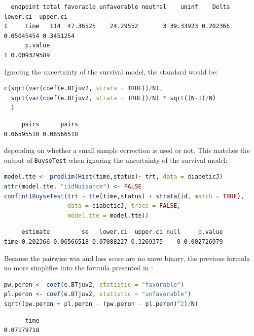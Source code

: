 \documentclass[12pt]{article}
\newcommand\Warning[1][3ex]{%
\renewcommand\stacktype{L}%
\scaleto{\stackon[1.3pt]{\color{red}$\triangle$}{\tiny\bfseries !}}{#1}%
\xspace
}
\begin{document}
\label{}
\begin{verbatim}
  endpoint total favorable unfavorable neutral    uninf    Delta   lower.ci  upper.ci
1     time   114  47.36525    24.29552       3 39.33923 0.202366 0.05045454 0.3451254
      p.value
1 0.009329589
\end{verbatim}


Ignoring the uncertainty of the survival model, the standard would be:
\begin{lstlisting}[language=r,numbers=none]
c(sqrt(var(coef(e.BTjuv2, strata = TRUE))/N),
  sqrt(var(coef(e.BTjuv2, strata = TRUE))/N) * sqrt((N-1)/N)
  )
\end{lstlisting}

\label{}
\begin{verbatim}
     pairs      pairs 
0.06595510 0.06566518
\end{verbatim}


depending on whether a small sample correction is used or not. This
matches the output of \texttt{BuyseTest} when ignoring the uncertainty of the
survival model:
\begin{lstlisting}[language=r,numbers=none]
model.tte <- prodlim(Hist(time,status)~ trt, data = diabeticJ)
attr(model.tte, "iidNuisance") <- FALSE
confint(BuyseTest(trt ~ tte(time,status) + strata(id, match = TRUE), 
                  data = diabeticJ, trace = FALSE,
                  model.tte = model.tte))
\end{lstlisting}

\label{}
\begin{verbatim}
     estimate         se   lower.ci  upper.ci null     p.value
time 0.202366 0.06566518 0.07088227 0.3269375    0 0.002726979
\end{verbatim}


\Warning Because the pairwise win and loss score are no more binary, the
previous formula no more simplifies into the formula presented in
\cite{matsouaka2022robust}:
\begin{lstlisting}[language=r,numbers=none]
pw.peron <- coef(e.BTjuv2, statistic = "favorable")
pl.peron <- coef(e.BTjuv2, statistic = "unfavorable")
sqrt((pw.peron + pl.peron - (pw.peron - pl.peron)^2)/N)
\end{lstlisting}

\label{}
\begin{verbatim}
      time 
0.07179718
\end{verbatim}


\clearpage 
\end{document}

